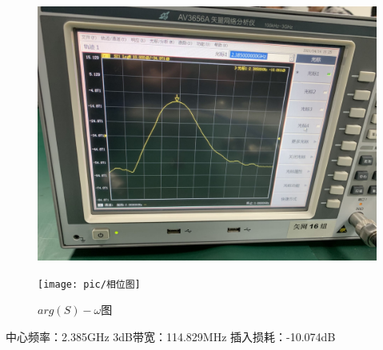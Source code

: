 \documentclass{../source/Experiment}
\begin{document}
\begin{figure}[H]
    \centering
    \begin{minipage}[t]{0.48\textwidth}
        \centering
        \includegraphics[width=1\textwidth]{pic/滤波特性}
        \caption{$S-w图$}
    \end{minipage}
    \begin{minipage}[t]{0.48\textwidth}
        \centering
        \texttt{[image: pic/相位图]}
        \caption{$arg(S)-\omega 图$}
    \end{minipage}
\end{figure}

中心频率：2.385GHz
3dB带宽：114.829MHz
插入损耗：-10.074dB
\end{document}
